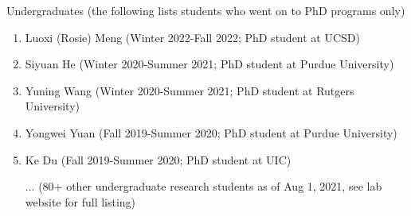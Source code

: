 \documentclass[10pt,letterpaper]{article}
\renewenvironment{itemize}{
  \begin{list}{}{
    \setlength{\leftmargin}{1.25em}
    \setlength{\itemsep}{0.25em}
    \setlength{\parskip}{0pt}
    \setlength{\parsep}{0.2em}
  }
}{
  \end{list}
}
\begin{document}
\begin{itemize}
\begin{enumerate}
        \end{enumerate}
  \item Undergraduates (the following lists students who went on to PhD programs only)
        \begin{enumerate}
          \item Luoxi (Rosie) Meng (Winter 2022-Fall 2022; PhD student at UCSD)
          \item Siyuan He (Winter 2020-Summer 2021; PhD student at Purdue University)
          \item Yuning Wang (Winter 2020-Summer 2021; PhD student at Rutgers University)
          \item Yongwei Yuan (Fall 2019-Summer 2020; PhD student at Purdue University)
          \item Ke Du (Fall 2019-Summer 2020; PhD student at UIC)
          \item[...] (80+ other undergraduate research students as of Aug 1, 2021, see lab website for full listing)
        \end{enumerate}
\end{itemize}
\end{document}
